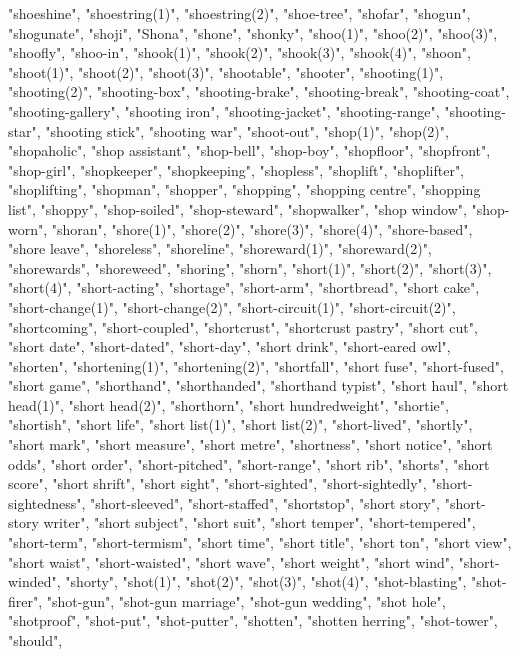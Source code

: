 "shoeshine",
"shoestring(1)",
"shoestring(2)",
"shoe-tree",
"shofar",
"shogun",
"shogunate",
"shoji",
"Shona",
"shone",
"shonky",
"shoo(1)",
"shoo(2)",
"shoo(3)",
"shoofly",
"shoo-in",
"shook(1)",
"shook(2)",
"shook(3)",
"shook(4)",
"shoon",
"shoot(1)",
"shoot(2)",
"shoot(3)",
"shootable",
"shooter",
"shooting(1)",
"shooting(2)",
"shooting-box",
"shooting-brake",
"shooting-break",
"shooting-coat",
"shooting-gallery",
"shooting iron",
"shooting-jacket",
"shooting-range",
"shooting-star",
"shooting stick",
"shooting war",
"shoot-out",
"shop(1)",
"shop(2)",
"shopaholic",
"shop assistant",
"shop-bell",
"shop-boy",
"shopfloor",
"shopfront",
"shop-girl",
"shopkeeper",
"shopkeeping",
"shopless",
"shoplift",
"shoplifter",
"shoplifting",
"shopman",
"shopper",
"shopping",
"shopping centre",
"shopping list",
"shoppy",
"shop-soiled",
"shop-steward",
"shopwalker",
"shop window",
"shop-worn",
"shoran",
"shore(1)",
"shore(2)",
"shore(3)",
"shore(4)",
"shore-based",
"shore leave",
"shoreless",
"shoreline",
"shoreward(1)",
"shoreward(2)",
"shorewards",
"shoreweed",
"shoring",
"shorn",
"short(1)",
"short(2)",
"short(3)",
"short(4)",
"short-acting",
"shortage",
"short-arm",
"shortbread",
"short cake",
"short-change(1)",
"short-change(2)",
"short-circuit(1)",
"short-circuit(2)",
"shortcoming",
"short-coupled",
"shortcrust",
"shortcrust pastry",
"short cut",
"short date",
"short-dated",
"short-day",
"short drink",
"short-eared owl",
"shorten",
"shortening(1)",
"shortening(2)",
"shortfall",
"short fuse",
"short-fused",
"short game",
"shorthand",
"shorthanded",
"shorthand typist",
"short haul",
"short head(1)",
"short head(2)",
"shorthorn",
"short hundredweight",
"shortie",
"shortish",
"short life",
"short list(1)",
"short list(2)",
"short-lived",
"shortly",
"short mark",
"short measure",
"short metre",
"shortness",
"short notice",
"short odds",
"short order",
"short-pitched",
"short-range",
"short rib",
"shorts",
"short score",
"short shrift",
"short sight",
"short-sighted",
"short-sightedly",
"short-sightedness",
"short-sleeved",
"short-staffed",
"shortstop",
"short story",
"short-story writer",
"short subject",
"short suit",
"short temper",
"short-tempered",
"short-term",
"short-termism",
"short time",
"short title",
"short ton",
"short view",
"short waist",
"short-waisted",
"short wave",
"short weight",
"short wind",
"short-winded",
"shorty",
"shot(1)",
"shot(2)",
"shot(3)",
"shot(4)",
"shot-blasting",
"shot-firer",
"shot-gun",
"shot-gun marriage",
"shot-gun wedding",
"shot hole",
"shotproof",
"shot-put",
"shot-putter",
"shotten",
"shotten herring",
"shot-tower",
"should",
